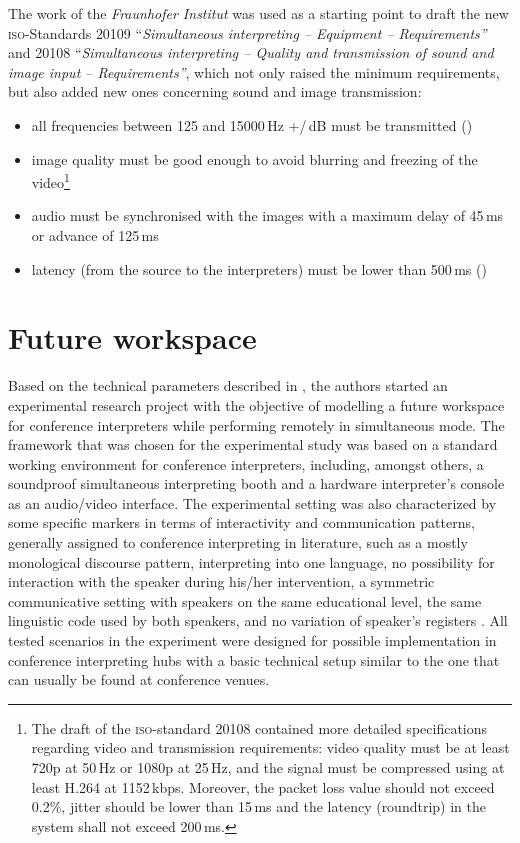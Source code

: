 \documentclass[output=paper]{langsci/langscibook}
\begin{document}
The work of the \textit{Fraunhofer Institut} was used as a starting point to draft the new \textsc{iso}-Standards \textsc{20109} ``\textit{Simultaneous interpreting -- Equipment -- Requirements''} and 20108 ``\textit{Simultaneous interpreting -- Quality and transmission of sound and image input -- Requirements''}, which not only raised the minimum requirements, but also added new ones concerning sound and image transmission:

\begin{itemize}
\item all frequencies between 125 and 15000\,Hz +/\,dB must be transmitted (\citeauthor[3]{ISO20109})
\item image quality must be good enough to avoid blurring and freezing of the video\footnote{The draft of the \textsc{iso}-standard \textsc{20108} contained more detailed specifications regarding video and transmission requirements: video quality must be at least 720p at 50\,Hz or 1080p at 25\,Hz, and the signal must be compressed using at least H.264 at 1152\,kbps. Moreover, the packet loss value should not exceed 0.2\%, jitter should be lower than 15\,ms and the latency (roundtrip) in the system shall not exceed 200\,ms.}
\item audio must be synchronised with the images with a maximum delay of 45\,ms or advance of 125\,ms
\item latency (from the source to the interpreters) must be lower than 500\,ms (\citeauthor[7--8]{ISO20108})
\end{itemize}

\section{Future workspace}
\label{sec:ziegler:06}
Based on the technical parameters described in , the authors started an experimental research project with the objective of modelling a future workspace for conference interpreters while performing remotely in simultaneous mode. The framework that was chosen for the experimental study was based on a standard working environment for conference interpreters, including, amongst others, a soundproof simultaneous interpreting booth and a hardware interpreter’s console as an audio/video interface. The experimental setting was also characterized by some specific markers in terms of interactivity and communication patterns, generally assigned to conference interpreting in literature, such as a mostly monological discourse pattern, interpreting into one language, no possibility for interaction with the speaker during his/her intervention, a symmetric communicative setting with speakers on the same educational level, the same linguistic code used by both speakers, and no variation of speaker’s registers \citep[582--583]{Angelelli2000}. All tested scenarios in the experiment were designed for possible implementation in conference interpreting hubs with a basic technical setup similar to the one that can usually be found at conference venues.
\end{document}
